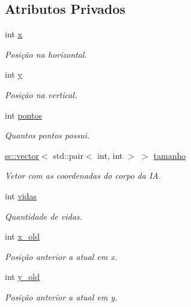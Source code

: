 \subsection*{Atributos Privados}
\begin{DoxyCompactItemize}
\item 
int \hyperlink{classSnaze_a437683faf08157e2c1e549c3ea1de441}{x}
\begin{DoxyCompactList}\small\item\em Posição na horizontal. \end{DoxyCompactList}\item 
int \hyperlink{classSnaze_aa444c1837a1dd4ae9af946e26533df54}{y}
\begin{DoxyCompactList}\small\item\em Posição na vertical. \end{DoxyCompactList}\item 
int \hyperlink{classSnaze_ac1c892159efbc10b5e84cd4eb8107e7c}{pontos}
\begin{DoxyCompactList}\small\item\em Quantos pontos possui. \end{DoxyCompactList}\item 
\hyperlink{classsc_1_1vector}{sc\+::vector}$<$ std\+::pair$<$ int, int $>$ $>$ \hyperlink{classSnaze_a4419e9300564766a252510d81c6c3827}{tamanho}
\begin{DoxyCompactList}\small\item\em Vetor com as coordenadas do corpo da IA. \end{DoxyCompactList}\item 
int \hyperlink{classSnaze_ac561e4dd85557cf710c1ddbe51b6517f}{vidas}
\begin{DoxyCompactList}\small\item\em Quantidade de vidas. \end{DoxyCompactList}\item 
int \hyperlink{classSnaze_aab6383a16dddde062cece7fc239bfe89}{x\+\_\+old}
\begin{DoxyCompactList}\small\item\em Posição anterior a atual em x. \end{DoxyCompactList}\item 
int \hyperlink{classSnaze_a89b6ed8b54d38796b79dbbe364e70180}{y\+\_\+old}
\begin{DoxyCompactList}\small\item\em Posição anterior a atual em y. \end{DoxyCompactList}\end{DoxyCompactItemize}


